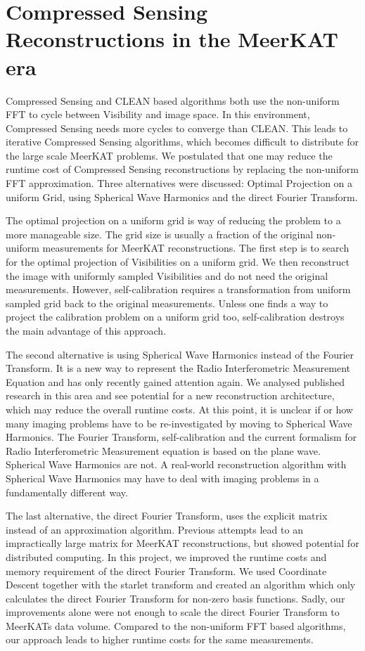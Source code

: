 \section{Compressed Sensing Reconstructions in the MeerKAT era}
Compressed Sensing and CLEAN based algorithms both use the non-uniform FFT to cycle between Visibility and image space. In this environment, Compressed Sensing needs more cycles to converge than CLEAN. This leads to iterative Compressed Sensing algorithms, which becomes difficult to distribute for the large scale MeerKAT problems. We postulated that one may reduce the runtime cost of Compressed Sensing reconstructions by replacing the non-uniform FFT approximation. Three alternatives were discussed: Optimal Projection on a uniform Grid, using Spherical Wave Harmonics and the direct Fourier Transform.

The optimal projection on a uniform grid is way of reducing the problem to a more manageable size. The grid size is usually a fraction of the original non-uniform measurements for MeerKAT reconstructions. The first step is to search for the optimal projection of Visibilities on a uniform grid. We then reconstruct the image with uniformly sampled Visibilities and do not need the original measurements. However, self-calibration requires a transformation from uniform sampled grid back to the original measurements. Unless one finds a way to project the calibration problem on a uniform grid too, self-calibration destroys the main advantage of this approach.

The second alternative is using Spherical Wave Harmonics instead of the Fourier Transform. It is a new way to represent the Radio Interferometric Measurement Equation and has only recently gained attention again. We analysed published research in this area\cite{carozzi2015imaging, mcewen2008simulating} and see potential for a new reconstruction architecture, which may reduce the overall runtime costs. At this point, it is unclear if or how many imaging problems have to be re-investigated by moving to Spherical Wave Harmonics. The Fourier Transform, self-calibration and the current formalism for Radio Interferometric Measurement equation is based on the plane wave\cite{smirnov2011revisiting}. Spherical Wave Harmonics are not. A real-world reconstruction algorithm with Spherical Wave Harmonics may have to deal with imaging problems in a fundamentally different way.

The last alternative, the direct Fourier Transform, uses the explicit matrix instead of an approximation algorithm. Previous attempts\cite{hardy2013direct} lead to an impractically large matrix for MeerKAT reconstructions, but showed potential for distributed computing. In this project, we improved the runtime costs and memory requirement of the direct Fourier Transform. We used Coordinate Descent together with the starlet transform and created an algorithm which only calculates the direct Fourier Transform for non-zero basis functions. Sadly, our improvements alone were not enough to scale the direct Fourier Transform to MeerKATs data volume. Compared to the non-uniform FFT based algorithms, our approach leads to higher runtime costs for the same measurements. 

